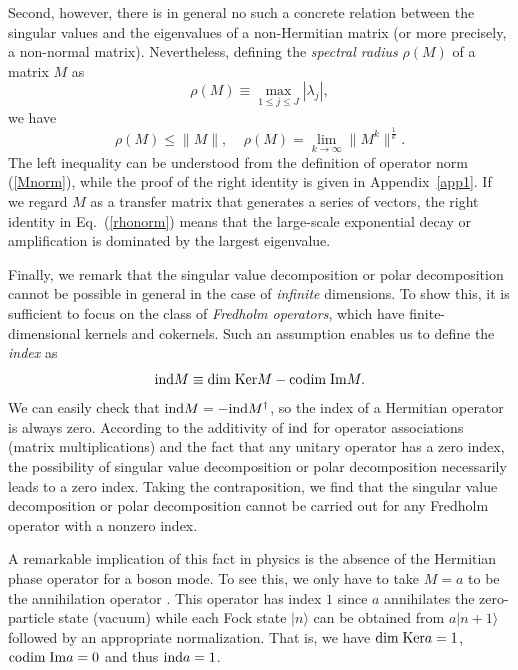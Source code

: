 \documentclass{tADP2e}
\theoremstyle{plain}
\theoremstyle{plain}
\theoremstyle{definition}
\begin{document}
Second, however, there is in general no such a concrete relation between the singular values and the eigenvalues of a non-Hermitian matrix (or more precisely, a non-normal matrix).  
Nevertheless, defining the \emph{spectral radius} $\rho(M)$ of a matrix $M$ as
\begin{equation}
\rho(M)\equiv\max_{1\le j\le J}|\lambda_j|,
\end{equation}
we have \cite{CDM00}
\begin{equation}
\rho(M)\le\|M\|,\;\;\;\;\rho(M)=\lim_{k\to\infty}\|M^k\|^{\frac{1}{k}}.
\label{rhonorm}
\end{equation}
The left inequality can be understood from the definition of operator norm (\ref{Mnorm}), while the proof of the right identity is given in Appendix~\ref{app1}. If we regard $M$ as a transfer matrix that generates a series of vectors, the right identity in Eq.~(\ref{rhonorm}) means that the large-scale exponential decay or amplification is dominated by the largest eigenvalue.  

Finally, we remark that the singular value decomposition or polar decomposition cannot be possible in general in the case of {\it infinite} dimensions. To show this, it is sufficient to focus on the class of \emph{Fredholm operators}, which have finite-dimensional kernels and cokernels. Such an assumption enables us to define the \emph{index} as \cite{TK80}
\begin{equation}
{\rm ind}M\equiv{\rm dim\;Ker}M-{\rm codim\;Im}M.
\end{equation}
We can easily check that ${\rm ind}M=-{\rm ind}M^\dag$, so the index of a Hermitian operator is always zero. According to the additivity of $\rm ind$ for operator associations (matrix multiplications) and the fact that any unitary operator has a zero index, the possibility of singular value decomposition or polar decomposition necessarily leads to a zero index. Taking the contraposition, we find that the singular value decomposition or polar decomposition cannot be carried out for any Fredholm operator with a nonzero index. 

A remarkable implication of this fact in physics is the absence of the Hermitian phase operator for a boson mode. To see this, we only have to take $M=a$ to be the annihilation operator \cite{FK95}. This operator has index $1$ since $a$ annihilates the zero-particle state (vacuum) while each Fock state $|n\rangle$ can be obtained from $a|n+1\rangle$ followed by an appropriate normalization. That is, we have ${\rm dim\;Ker}a=1$, ${\rm codim\;Im}a=0$ and thus ${\rm ind}a=1$.
\end{document}
